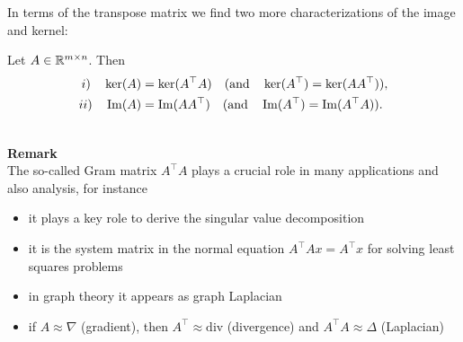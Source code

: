 \begin{frame}
	In terms of the transpose matrix we find two more characterizations of the image and kernel:
	\begin{lemma}\label{lem:kernel-image}
			Let $A \in {\mathbb{R}}^{m\times n}$. Then
		\begin{align*}
		i)~~~\ker(A) &= \ker(A^\top A)~~~(\text{and}~~~\ker(A^\top) = \ker(AA^\top )),\\
		ii)~~~\operatorname{Im}(A) & = \operatorname{Im}(A A^\top)~~~(\text{and}~~~\operatorname{Im}(A^\top) = \operatorname{Im}(A^\top A)).
 		\end{align*}
	\end{lemma}
{
~\\
\small 
\textbf{Remark}\\
The so-called Gram matrix $A^\top A$ plays a crucial role in many applications and also analysis, for instance
\begin{itemize}
	\item it plays a key role to derive the singular value decomposition
	\item it is the system matrix in the normal equation $A^\top A x=A^\top x $ for solving least squares problems
	\item in graph theory it appears as graph Laplacian
	\item if $A \approx \nabla$ (gradient), then $A^\top\approx \text{div}$ (divergence) and $A^\top A \approx \Delta$ (Laplacian)
\end{itemize}
}
\end{frame}

